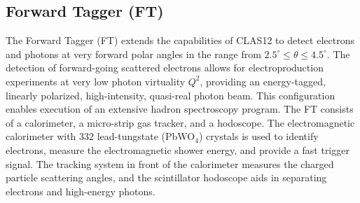 \documentclass[final,3p,twocolumn]{elsarticle}
\begin{document}
\subsection{Forward Tagger (FT)}

The Forward Tagger (FT) extends the capabilities of CLAS12 to detect electrons and photons at very forward
polar angles in the range from $2.5^\circ \le \theta \le 4.5^\circ$. The detection of forward-going scattered
electrons allows for electroproduction experiments at very low photon virtuality $Q^2$, providing an
energy-tagged, linearly polarized, high-intensity, quasi-real photon beam. This configuration enables execution of
an extensive hadron spectroscopy program. The FT consists of a calorimeter, a micro-strip gas tracker, and a
hodoscope. The electromagnetic calorimeter with 332 lead-tungstate (PbWO$_4$) crystals is used to identify
electrons,  measure the electromagnetic shower energy, and provide a fast trigger signal. The tracking system in
front of the calorimeter measures the charged particle scattering angles, and the scintillator hodoscope aids in
separating electrons and high-energy photons.
\end{document}
